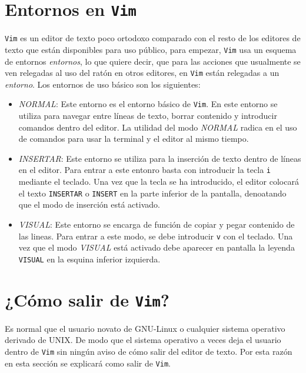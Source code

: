 \documentclass[10pt]{article}
\begin{document}
\section{Entornos en \texttt{Vim}}
\texttt{Vim} es un editor de texto poco ortodoxo comparado con el resto de los editores de texto que están disponibles para uso público, para empezar, \texttt{Vim} usa un esquema de entornos \textit{entornos}, lo que quiere decir, que para las acciones que usualmente se ven relegadas al uso del ratón en otros editores, en \texttt{Vim} están relegadas a un \textit{entorno}. Los entornos de uso básico son los siguientes:
\begin{itemize}
	\item \textit{NORMAL}: Este entorno es el entorno básico de \texttt{Vim}. En este entorno se utiliza para navegar entre líneas de texto, borrar contenido y introducir comandos dentro del editor.
	      La utilidad del modo \textit{NORMAL} radica en el uso de comandos para usar la terminal y el editor al mismo tiempo. 
	\item \textit{INSERTAR}: Este entorno se utiliza para la inserción de texto dentro de líneas en el editor. Para entrar a este entonro basta con introducir la tecla \texttt{i} mediante el teclado.
Una vez que la tecla se ha introducido, el editor colocará el texto \texttt{INSERTAR} o \texttt{INSERT} en la parte inferior de la pantalla, denoatando que el modo de inserción está activado. 
	\item \textit{VISUAL}: Este entorno se encarga de función de copiar y pegar contenido de las lineas. Para entrar a este modo, se debe introducir \texttt{v} con el teclado.
Una vez que el modo \textit{VISUAL} está activado debe aparecer en pantalla la leyenda \texttt{VISUAL} en la esquina inferior izquierda. 
\end{itemize}
\section{¿Cómo salir de \texttt{Vim}?}
Es normal que el usuario novato de GNU-Linux o cualquier sistema operativo derivado de UNIX. De modo que el sistema operativo a veces deja el usuario dentro de \texttt{Vim} sin ningún aviso de cómo salir del editor de texto. Por esta razón en esta sección se explicará como salir de \texttt{Vim}. 
\end{document}
